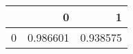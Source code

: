 \begin{tabular}{lrr}
\toprule
{} &         0 &         1 \\
\midrule
0 &  0.986601 &  0.938575 \\
\bottomrule
\end{tabular}
